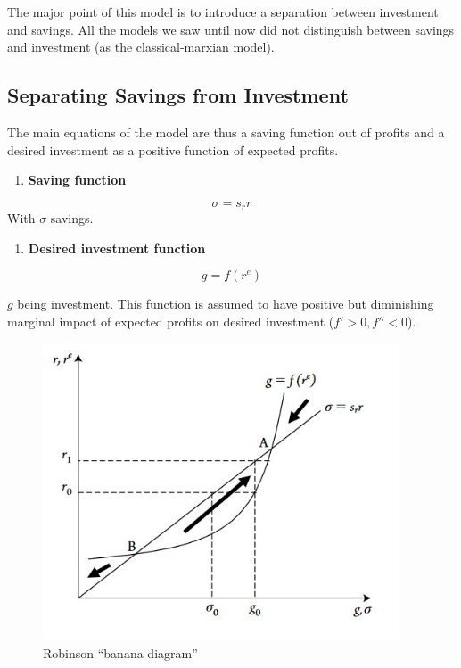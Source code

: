 \documentclass[
  letterpaper,
  DIV=11,
  numbers=noendperiod]{scrreprt}
\providecommand{\tightlist}{%
  \setlength{\itemsep}{0pt}\setlength{\parskip}{0pt}}\usepackage{longtable,booktabs,array}
\begin{document}
The major point of this model is to introduce a separation between
investment and savings. All the models we saw until now did not
distinguish between savings and investment (as the classical-marxian
model).

\hypertarget{separating-savings-from-investment}{%
\subsection{Separating Savings from
Investment}\label{separating-savings-from-investment}}

The main equations of the model are thus a saving function out of
profits and a desired investment as a positive function of expected
profits.

\begin{enumerate}
\def\labelenumi{\arabic{enumi}.}
\tightlist
\item
  \textbf{Saving function}
\end{enumerate}

\[\sigma = s_rr\] With \(\sigma\) savings.

\begin{enumerate}
\def\labelenumi{\arabic{enumi}.}
\setcounter{enumi}{1}
\tightlist
\item
  \textbf{Desired investment function}
\end{enumerate}

\[g = f(r^e)\]

\(g\) being investment. This function is assumed to have positive but
diminishing marginal impact of expected profits on desired investment
(\(f'>0, f''<0\)).

\begin{figure}

{\centering \includegraphics[width=4.16667in,height=\textheight]{images/robinson.jpg}

}

\caption{Robinson ``banana diagram''}

\end{figure}
\end{document}
